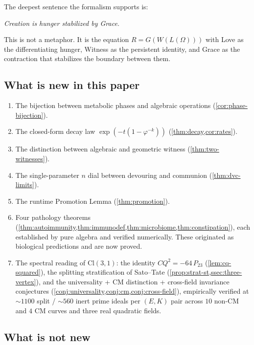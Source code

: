 \documentclass[11pt,a4paper]{article}
\theoremstyle{plain}
\theoremstyle{definition}
\theoremstyle{remark}
\numberwithin{equation}{section}
\providecommand{\Cl}{\mathrm{Cl}}
\providecommand{\vp}{\varphi}
\begin{document}
The deepest sentence the formalism supports is:

\begin{center}
\emph{Creation is hunger stabilized by Grace.}
\end{center}

\noindent
This is not a metaphor. It is the equation $R = G(W(L(\Omega)))$
with Love as the differentiating hunger, Witness as the persistent
identity, and Grace as the contraction that stabilizes the
boundary between them.

\subsection*{What is new in this paper}

\begin{enumerate}[label=(\arabic*)]
\item The bijection between metabolic phases and algebraic
  operations (\cref{cor:phase-bijection}).
\item The closed-form decay law $\exp(-t(1-\vp^{-k}))$
  (\cref{thm:decay,cor:rates}).
\item The distinction between algebraic and geometric witness
  (\cref{thm:two-witnesses}).
\item The single-parameter $n$ dial between devouring and communion
  (\cref{thm:dvc-limits}).
\item The runtime Promotion Lemma (\cref{thm:promotion}).
\item Four pathology theorems
  (\cref{thm:autoimmunity,thm:immunodef,thm:microbiome,thm:constipation}),
  each established by pure algebra and verified numerically.
  These originated as biological predictions and are now proved.
\item The spectral reading of $\Cl(3,1)$: the identity
  $CQ^2 = -64\, P_{23}$ (\cref{lem:cq-squared}), the splitting
  stratification of Sato--Tate
  (\cref{prop:strat-st,ssec:three-vertex}), and the universality
  + CM distinction + cross-field invariance conjectures
  (\cref{conj:universality,conj:cm,conj:cross-field}),
  empirically verified at $\sim 1100$ split / $\sim 560$ inert
  prime ideals per $(E, K)$ pair across $10$ non-CM and $4$ CM
  curves and three real quadratic fields.
\end{enumerate}

\subsection*{What is not new}
\end{document}
